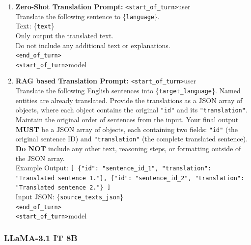 \documentclass[final]{ecai}
\begin{document}
\begin{enumerate}
    \item \textbf{Zero-Shot Translation Prompt:} \texttt{<start\_of\_turn>}user\\
    Translate the following sentence to \{\texttt{language}\}.\\
    Text: \{\texttt{text}\}\\
    Only output the translated text.\\
    Do not include any additional text or explanations.\\
    \texttt{<end\_of\_turn>}\\
    \texttt{<start\_of\_turn>}model

    \item \textbf{RAG based Translation Prompt:} \texttt{<start\_of\_turn>}user\\
    Translate the following English sentences into \{\texttt{target\_language}\}. Named entities are already translated. Provide the translations as a JSON array of objects, where each object contains the original \texttt{"id"} and its \texttt{"translation"}. Maintain the original order of sentences from the input. Your final output \textbf{MUST} be a JSON array of objects, each containing two fields: \texttt{"id"} (the original sentence ID) and \texttt{"translation"} (the complete translated sentence). \textbf{Do NOT} include any other text, reasoning steps, or formatting outside of the JSON array.\\
    Example Output: \texttt{[ \{"id": "sentence\_id\_1", "translation": "Translated sentence 1."\}, \{"id": "sentence\_id\_2", "translation": "Translated sentence 2."\} ]}\\
    Input JSON: \{\texttt{source\_texts\_json}\}\\
    \texttt{<end\_of\_turn>}\\
    \texttt{<start\_of\_turn>}model
\end{enumerate}

\subsubsection{LLaMA-3.1 IT 8B}
\end{document}
